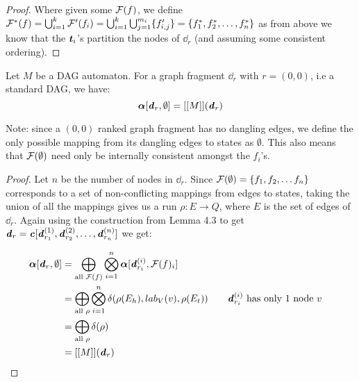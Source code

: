 \documentclass[11pt]{article}
\begin{document}
\begin{proof}
  Where given some $\calF(f)$, we define $\calF^*(f) = \bigcup_{i=1}^k
  \calF'(f_i)  =  \bigcup_{i=1}^k \bigcup_{j=1}^{m_i} \{f'_{i,j}\} = \{f^*_1,
  f^*_2, \ldots, f^*_n\} $ as from above we know that the $\tt_i$'s partition
  the nodes of $\dd_r$ (and assuming some consistent ordering). 
\end{proof}

\begin{lemma}\label{lem:partialweightgraphweight} Let $M$ be a DAG automaton.
  For a graph fragment $\dd_r$ with $r = (0,0)$, i.e a standard DAG, we have:
  \[
  \aalpha[\dd_r, \emptyset] = [[M]](\dd_r) 
  \]
  
\end{lemma}
Note: since a $(0,0)$ ranked graph fragment has no dangling edges, we define the
only possible mapping from its dangling edges to states as $\emptyset$. This
also means that $\calF(\emptyset)$ need only be internally consistent amongst
the $f_i$'s.

\begin{proof}
Let $n$ be the number of nodes in $\dd_r$. Since $\calF(\emptyset) = \{f_1,
f_2,\ldots f_n\}$ corresponds to a set of non-conflicting mappings from edges to
states, taking the union of all the mappings gives us a run $\rho: E \rightarrow
Q$, where $E$ is the set of edges of $\dd_r$. Again using the construction from
Lemma 4.3 to get $\dd_r = \cc[\dd^{(1)}_{r_1}, \dd^{(2)}_{r_2},\ldots,
\dd^{(n)}_{r_n}]$ we get:

\begin{align*}
  \aalpha[\dd_r, \emptyset] &= \bigoplus_{\text{all }\calF(f)} \bigotimes_{i=1}^n \aalpha[\dd^{(i)}_{r_i}, \calF(f)_i]\\
  &= \bigoplus_{\text{all } \rho} \bigotimes_{i=1}^n \delta(\rho(E_h), lab_V(v), \rho(E_t)) &&\quad \dd^{(i)}_{r_i}\text{ has only 1 node } v\\
  &=  \bigoplus_{\text{all } \rho} \delta(\rho)\\
  &= [[M]](\dd_r)
\end{align*}
\end{proof}
\end{document}
